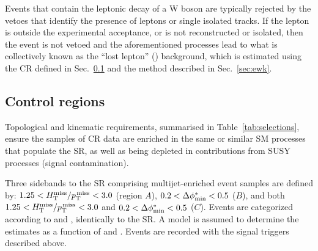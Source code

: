 Events that contain the leptonic decay of a W boson are typically
rejected by the vetoes that identify the presence of leptons or single
isolated tracks. If the lepton is outside the experimental acceptance,
or is not reconstructed or isolated, then the event is not vetoed and
the aforementioned processes lead to what is collectively known as the
``lost lepton'' (\lost) background, which is estimated using the \mj
CR defined in Sec.~\ref{sec:control} and the method described in
Sec.~\ref{sec:ewk}.


\subsection{Control regions}
\label{sec:control}

Topological and kinematic requirements, summarised in
Table~\ref{tab:selections}, ensure the samples of CR data are enriched
in the same or similar SM processes that populate the SR, as well as
being depleted in contributions from SUSY processes (signal
contamination).

Three sidebands to the SR comprising multijet-enriched event samples
are defined by: $1.25 < H_{\text{T}}^{\text{miss}} / p_{\text{T}}^{\kern1pt\text{miss}} < 3.0$ (region $A$), $0.2 < \Delta\phi^{*}_\text{min} <
0.5$ ($B$), and both $1.25 < H_{\text{T}}^{\text{miss}} / p_{\text{T}}^{\kern1pt\text{miss}} < 3.0$ and $0.2 < \Delta\phi^{*}_\text{min} < 0.5$
($C$). Events are categorized according to \njet and \scalht,
identically to the SR. A model is assumed to determine the estimates
as a function of \nb and \mht. Events are recorded with the signal
triggers described above.

